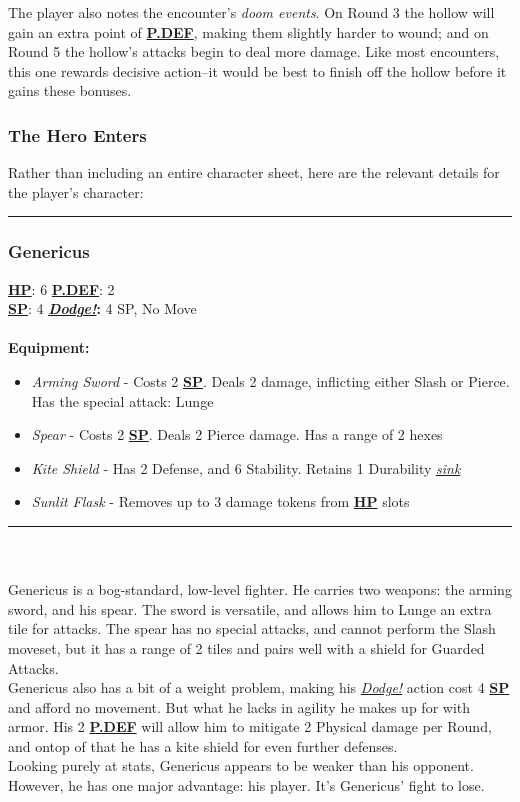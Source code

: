 \documentclass[12pt]{article}
\newcommand{\refto}[1]{\hyperlink{#1}{\textbf{#1}}}
\newcommand{\reftoit}[1]{\hyperlink{#1}{\emph{#1}}}
\begin{document}
\begin{multicols*}{2}
\columnbreak

The player also notes the encounter’s \emph{doom events}. On Round 3 the hollow will gain an extra point of \refto{P.DEF}, making them slightly harder to wound; and on Round 5 the hollow’s attacks begin to deal more damage. Like most encounters, this one rewards decisive action--it would be best to finish off the hollow before it gains these bonuses.

\subsubsection*{The Hero Enters}
Rather than including an entire character sheet, here are the relevant details for the player’s character:\\
\hrule
\subsubsection*{Genericus}
\refto{HP}: 6 \hspace*{2cm} \refto{P.DEF}: 2\\
\refto{SP}: 4 \hspace*{2.1cm} \textbf{\reftoit{Dodge!}:} 4 SP, No Move\\\\
\textbf{Equipment:}
\begin{itemize}
\item \emph{Arming Sword} - Costs 2 \refto{SP}. Deals 2 damage, inflicting either Slash or Pierce. Has the special attack: Lunge
\item \emph{Spear} - Costs 2 \refto{SP}. Deals 2 Pierce damage. Has a range of 2 hexes
\item \emph{Kite Shield} - Has 2 Defense, and 6 Stability. Retains 1 Durability \reftoit{sink}
\item \emph{Sunlit Flask} - Removes up to 3 damage tokens from \refto{HP} slots
\end{itemize}
\hrule
\ \\ \ \\
Genericus is a bog-standard, low-level fighter. He carries two weapons: the arming sword, and his spear. The sword is versatile, and allows him to Lunge an extra tile for attacks. The spear has no special attacks, and cannot perform the Slash moveset, but it has a range of 2 tiles and pairs well with a shield for Guarded Attacks.\\
Genericus also has a bit of a weight problem, making his \reftoit{Dodge!} action cost 4 \refto{SP} and afford no movement. But what he lacks in agility he makes up for with armor. His 2 \refto{P.DEF} will allow him to mitigate 2 Physical damage per Round, and ontop of that he has a kite shield for even further defenses.\\
Looking purely at stats, Genericus appears to be weaker than his opponent. However, he has one major advantage: his player. It’s Genericus’ fight to lose.
\end{multicols*}
\pagebreak
\end{document}
